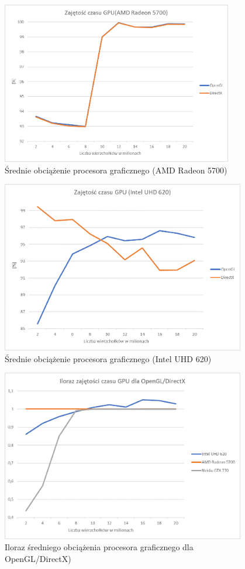 \documentclass[archive]{mgr}
\begin{document}
\begin{figure}[h!]
  \centering
    \includegraphics[width=0.9\textwidth]{images/gpu/2.png}
   \caption{Średnie obciążenie procesora graficznego (AMD Radeon 5700)}
   \label{lab:72}
\end{figure}
\bigbreak
\begin{figure}[h!]
  \centering
    \includegraphics[width=0.95\textwidth]{images/gpu/3.png}
   \caption{Średnie obciążenie procesora graficznego (Intel UHD 620)}
   \label{lab:73}
\end{figure}
\begin{figure}[h!]
  \centering
    \includegraphics[width=0.95\textwidth]{images/gpu/4.png}
   \caption{Iloraz średniego obciążenia procesora graficznego dla OpenGL/DirectX)}
   \label{lab:73}
\end{figure}
\end{document}
